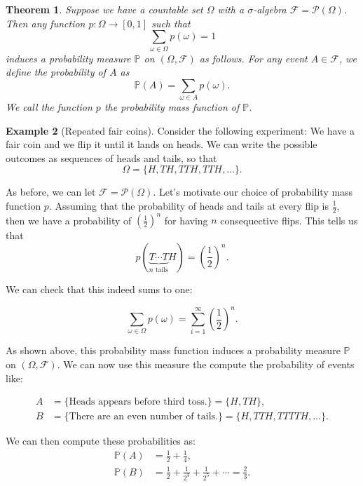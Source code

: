 \documentclass[12pt]{article}
\newcommand{\calF}{\mathcal{F}}
\newcommand{\Prob}{\mathbb{P}}
\newtheorem{thm}{Theorem}[section]
\theoremstyle{definition}
\newtheorem{exmp}[thm]{Example}
\theoremstyle{remark}
\numberwithin{equation}{section}
\begin{document}
\begin{thm}
  Suppose we have a countable set $\Omega$ with a $\sigma$-algebra $\calF=\mathcal{P}(\Omega)$. Then any function $p \colon \Omega \to [0, 1]$ such that 
\begin{equation}
  \sum_{\omega\in\Omega} p(\omega) = 1
\end{equation}
induces a probability measure $\Prob$ on $(\Omega, \calF)$ as follows. For any event $A\in \calF$, we define the probability of $A$ as 
\begin{equation}
  \Prob(A) = \sum_{\omega \in A} p(\omega).
\end{equation}
We call the function $p$ the \emph{probability mass function} of $\Prob$.
\end{thm}

\begin{exmp}[Repeated fair coins]
Consider the following experiment: We have a fair coin and we flip it until it lands on heads. We can write the possible outcomes as sequences of heads and tails, so that
\begin{equation}
  \Omega = \{ H, TH, TTH, TTH, \ldots \}.
\end{equation}

As before, we can let $\calF = \mathcal{P}(\Omega)$. Let's motivate our choice of probability mass function $p$. Assuming that the probability of heads and tails at every flip is $\frac{1}{2}$, then we have a probability of $\left(\frac{1}{2}\right)^n$ for having $n$ consequective flips. This tells us that
\begin{equation}
p(\underbrace{T\cdots T}_{n \text{ tails}} H) = \left(\frac{1}{2}\right)^n.
\end{equation}

We can check that this indeed sums to one:

\begin{equation}
  \sum_{\omega\in\Omega}p(\omega) = \sum_{i=1}^{\infty} \left(\frac{1}{2}\right)^n. 
\end{equation}

As shown above, this probability mass function induces a probability measure $\Prob$ on $(\Omega, \calF)$. We can now use this measure the compute the probability of events like:

\begin{align}
  A &= \{ \text{Heads appears before third toss.} \} = \{H, TH \},\\
  B &= \{ \text{There are an even number of tails.}\} = \{H, TTH, TTTTH, \ldots\}.
\end{align}

We can then compute these probabilities as:
\begin{align}
  \Prob(A) &= \frac{1}{2} + \frac{1}{4}, \\
  \Prob(B) &= \frac{1}{2} + \frac{1}{2^3} + \frac{1}{2^5} + \cdots = \frac{2}{3}.   
\end{align}
\end{exmp}
\end{document}
